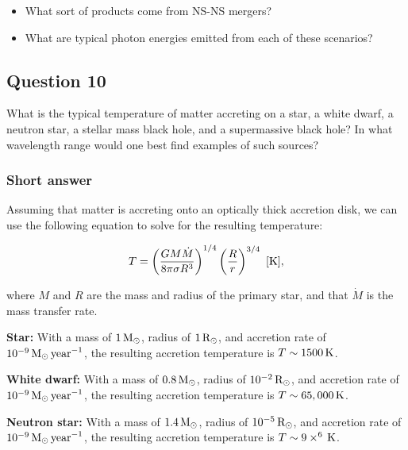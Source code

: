 \documentclass[a4paper,10pt]{article}
\begin{document}
\begin{itemize}
    \item What sort of products come from NS-NS mergers?
    \item What are typical photon energies emitted from each of these scenarios?
\end{itemize}


\newpage
\subsection{Question 10}

What is the typical temperature of matter accreting on a star, a white dwarf, a neutron star, a stellar mass black hole, and a supermassive black hole? In what wavelength range would one best find examples of such sources?

\subsubsection{Short answer}

Assuming that matter is accreting onto an optically thick accretion disk, we can use the following equation to solve for the resulting temperature:

\begin{align*}
T = \left(\frac{GM\dot{M}}{8\pi\sigma R^3}\right)^{1/4} \left(\frac{R}{r}\right)^{3/4} ~ [{\rm K}],
\end{align*}

{\noindent}where $M$ and $R$ are the mass and radius of the primary star, and that $\dot{M}$ is the mass transfer rate.

{\noindent}\textbf{Star:} With a mass of $1\,{\rm M_\odot}$, radius of $1\,{\rm R_\odot}$, and accretion rate of $10^{-9}\,{\rm M_\odot\,year}^{-1}$, the resulting accretion temperature is $T\sim1500\,{\rm K}$.

{\noindent}\textbf{White dwarf:} With a mass of $0.8\,{\rm M_\odot}$, radius of $10^{-2}\,{\rm R_\odot}$, and accretion rate of $10^{-9}\,{\rm M_\odot\,year}^{-1}$, the resulting accretion temperature is $T\sim65,000\,{\rm K}$.

{\noindent}\textbf{Neutron star:} With a mass of $1.4\,{\rm M_\odot}$, radius of $10^{-5}\,{\rm R_\odot}$, and accretion rate of $10^{-9}\,{\rm M_\odot\,year}^{-1}$, the resulting accretion temperature is $T\sim9\times^6\,{\rm K}$.
\end{document}
